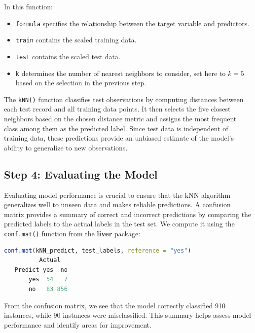 \documentclass[
  11pt,
]{book}
\newcommand{\passthrough}[1]{#1}
\providecommand{\tightlist}{%
  \setlength{\itemsep}{0pt}\setlength{\parskip}{0pt}}
\theoremstyle{definition}
\theoremstyle{definition}
\theoremstyle{definition}
\theoremstyle{definition}
\theoremstyle{remark}
\begin{document}
In this function:

\begin{itemize}
\tightlist
\item
  \passthrough{\lstinline!formula!} specifies the relationship between the target variable and predictors.\\
\item
  \passthrough{\lstinline!train!} contains the scaled training data.\\
\item
  \passthrough{\lstinline!test!} contains the scaled test data.\\
\item
  \passthrough{\lstinline!k!} determines the number of nearest neighbors to consider, set here to \(k = 5\) based on the selection in the previous step.
\end{itemize}

The \passthrough{\lstinline!kNN()!} function classifies test observations by computing distances between each test record and all training data points. It then selects the five closest neighbors based on the chosen distance metric and assigns the most frequent class among them as the predicted label. Since test data is independent of training data, these predictions provide an unbiased estimate of the model's ability to generalize to new observations.

\subsection{Step 4: Evaluating the Model}\label{step-4-evaluating-the-model}

Evaluating model performance is crucial to ensure that the kNN algorithm generalizes well to unseen data and makes reliable predictions. A confusion matrix provides a summary of correct and incorrect predictions by comparing the predicted labels to the actual labels in the test set. We compute it using the \passthrough{\lstinline!conf.mat()!} function from the \textbf{liver} package:

\begin{lstlisting}[language=R]
conf.mat(kNN_predict, test_labels, reference = "yes")
          Actual
   Predict yes  no
       yes  54   7
       no   83 856
\end{lstlisting}

From the confusion matrix, we see that the model correctly classified 910 instances, while 90 instances were misclassified. This summary helps assess model performance and identify areas for improvement.
\end{document}
